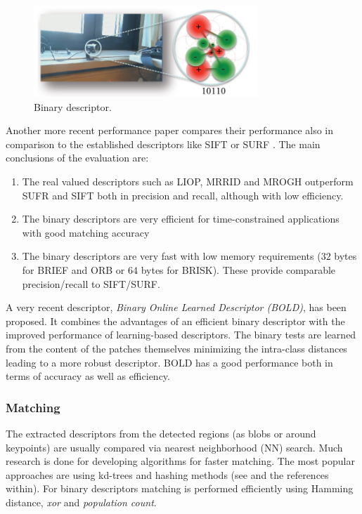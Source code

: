\begin{figure}[H]
\begin{center}
\includegraphics[width=0.75\textwidth]{fig/BinDescr}
\end{center}
\caption{Binary descriptor.}
\label{fig:bindescr}
\end{figure}

Another more recent performance paper compares their performance also in comparison to the established descriptors like SIFT or SURF \cite{conf:icpr:MiksikM12}. The main conclusions of the evaluation are:
\begin{enumerate}
\item{The real valued descriptors such as LIOP, MRRID and MROGH outperform SUFR and SIFT both in precision and recall, although with low efficiency.}
\item{The binary descriptors are very efficient for time-constrained applications with good matching accuracy}
\item{The binary descriptors are very fast with low memory requirements ($32$ bytes for BRIEF and ORB or $64$ bytes for BRISK). These provide comparable precision/recall to SIFT/SURF.}
\end{enumerate}

A very recent descriptor, {\em Binary Online Learned Descriptor (BOLD)}, \cite{Balntas_2015_CVPR} has been proposed. It combines the advantages of an efficient binary descriptor with the improved performance of learning-based descriptors. The binary tests are learned from the content of the patches themselves minimizing the intra-class distances leading to a more robust descriptor. BOLD has a good performance both in terms of accuracy as well as efficiency.

\subsubsection{Matching}
The extracted descriptors from the detected regions (as blobs or around keypoints) are usually compared via nearest neighborhood (NN) search. Much research is done for developing algorithms for faster matching. The most popular approaches are using kd-trees and hashing methods (see \cite{conf:icpr:MiksikM12} and the references within). For binary descriptors matching is performed efficiently using Hamming distance, {\em xor} and {\em population count}.


